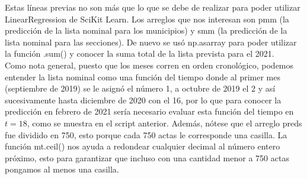\documentclass[12pt,letterpaper]{article}
\begin{document}
\normalsize{Estas líneas previas no son más que lo que se debe de realizar para poder utilizar LinearRegression de SciKit Learn. Los arreglos que nos interesan son pmm (la predicción de la lista nominal para los municipios) y smm (la predicción de la lista nominal para las secciones). De nuevo se usó np.asarray para poder utilizar la función .sum() y conocer la suma total de la lista prevista para el 2021.\\

Como nota general, puesto que los meses corren en orden cronológico, podemos entender la lista nominal como una función del tiempo donde al primer mes (septiembre de 2019) se le asignó el número 1, a octubre de 2019 el 2 y así sucesivamente hasta diciembre de 2020 con el 16, por lo que para conocer la predicción en febrero de 2021 sería necesario evaluar esta función del tiempo en $t=18$, como se muestra en el script anterior. Además, nótese que el arreglo preds fue dividido en 750, esto porque cada 750 actas le corresponde una casilla. La función mt.ceil() nos ayuda a redondear cualquier decimal al número entero próximo, esto para garantizar que incluso con una cantidad menor a 750 actas pongamos al menos una casilla.}
\end{document}

